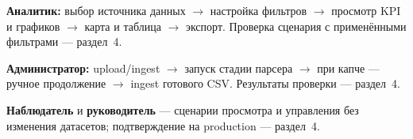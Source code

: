 \textbf{Аналитик:} выбор источника данных $\rightarrow$ настройка фильтров $\rightarrow$ просмотр KPI и графиков $\rightarrow$ карта и таблица $\rightarrow$ экспорт. Проверка сценария с применёнными фильтрами --- раздел~4.

\textbf{Администратор:} upload/ingest $\rightarrow$ запуск стадии парсера $\rightarrow$ при капче --- ручное продолжение $\rightarrow$ ingest готового CSV. Результаты проверки --- раздел~4.

\textbf{Наблюдатель} и \textbf{руководитель} --- сценарии просмотра и управления без изменения датасетов; подтверждение на production --- раздел~4.
